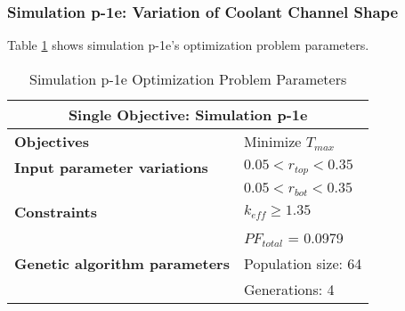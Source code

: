\subsubsection{Simulation p-1e: Variation of Coolant Channel Shape}
Table \ref{tab:simulationp1e} shows simulation p-1e's optimization problem parameters. 
\begin{table}[htbp!]
    \centering
    \onehalfspacing
    \caption{Simulation p-1e Optimization Problem Parameters}
	\label{tab:simulationp1e}
    \footnotesize
    \begin{tabular}{l|p{3cm}}
    \hline 
    \multicolumn{2}{c}{\textbf{Single Objective: Simulation p-1e}} \\
    \hline 
    \textbf{Objectives} & Minimize $T_{max}$ \\
    \hline 
    \textbf{Input parameter variations} & $0.05<r_{top}<0.35$ \\
    & $0.05<r_{bot}<0.35$ \\
    \hline
    \textbf{Constraints} & $k_{eff} \geq 1.35$\\ 
    & $PF_{total}$ = 0.0979\\
    \hline 
    \textbf{Genetic algorithm parameters} & Population size: 64 \\
    & Generations: 4 \\
    \hline
    \end{tabular}
\end{table}

